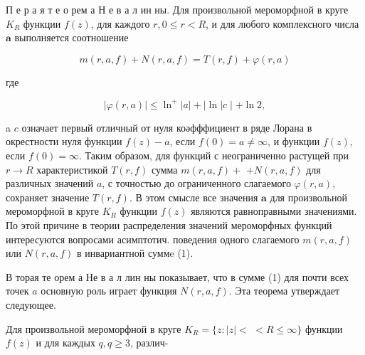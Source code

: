 \documentclass[10pt]{article}
\begin{document}
П е р а я т е о рем а Н е в а л ин ны. Для произвольной мероморфной в круге $K_{R}$ функции $f(z)$, для каждого $r, 0 \leqslant r<R$, и для любого комплексного числа $\boldsymbol{a}$ выполняется соотношение



\[

m(r, a, f)+N(r, a, f)=T(r, f)+\varphi(r, a)

\]



где



\[

|\varphi(r, a)| \leqslant \ln ^{+}|a|+|\ln | c \mid+\ln 2,

\]



a $c$ означает первый отличный от нуля коәфффициент в ряде Лорана в окрестности нуля функции $f(z)-a$, если $f(0)=a \neq \infty$, и функции $f(z)$, если $f(0)=\infty$. Таким образом, для функций с неограниченно растущей при $r \rightarrow R$ характеристикой $T(r, f)$ сумма $m(r, a, f)+$ $+N(r, a, f)$ для различных значений $a$, с точностью до ограниченного слагаемого $\varphi(r, a)$, сохраняет значение $T(r, f)$. В этом смысле все значения $\boldsymbol{a}$ для произвольной мероморфной в круге $K_{R}$ функции $f(z)$ являются равноправными значениями. По этой причине в теории распределения значений мероморфных функций интересуются вопросами асимптотич. поведения одного слагаемого $m(r, a, f)$ или $N(r, a, f)$ в инвариантной суммe (1).



В торая те орем а Не в а л лин ны показывает, что в сумме (1) для почти всех точек $a$ основную роль играет функция $N(r, a, f)$. Эта теорема утверждает следующее.



Для произвольной мероморфной в круге $K_{R}=\{z:|z|<$ $<R \leqslant \infty\}$ функции $f(z)$ и для каждых $q, q \geqslant 3$, различ-
\end{document}
